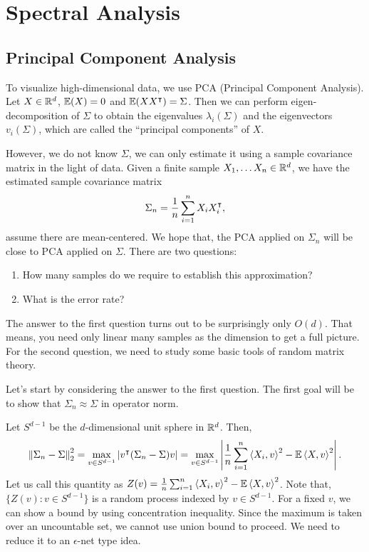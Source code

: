 \documentclass[12pt]{article}
\begin{document}
\section{Spectral Analysis}

\subsection{Principal Component Analysis}

To visualize high-dimensional data, we use PCA (Principal Component Analysis). Let $X \in \mathbb{R}^d$, $\mathbb{E}(X) = 0$ and $\mathbb{E}(XX^{\intercal}) = \Sigma$. Then we can perform eigen-decomposition of $\Sigma$ to obtain the eigenvalues $\lambda_i(\Sigma)$ and the eigenvectors $v_i(\Sigma)$, which are called the ``principal components'' of $X$. 

However, we do not know $\Sigma$, we can only estimate it using a sample covariance matrix in the light of data. Given a finite sample $X_1, \dots X_n \in \mathbb{R}^d$, we have the estimated sample covariance matrix 
\begin{equation*}
    \Sigma_n = \dfrac{1}{n}\sum_{i=1}^n X_i X_i^{\intercal},
\end{equation*}
\noindent assume there are mean-centered. We hope that, the PCA applied on $\Sigma_n$ will be close to PCA applied on $\Sigma$. There are two questions:

\begin{enumerate}
    \item How many samples do we require to establish this approximation?
    \item What is the error rate? 
\end{enumerate}

The answer to the first question turns out to be surprisingly only $O(d)$. That means, you need only linear many samples as the dimension to get a full picture. For the second question, we need to study some basic tools of random matrix theory.

Let's start by considering the answer to the first question. The first goal will be to show that $\Sigma_n \approx \Sigma$ in operator norm.

Let $S^{d-1}$ be the $d$-dimensional unit sphere in $\mathbb{R}^d$. Then,
\begin{equation*}
    \left\Vert \Sigma_n - \Sigma \right\Vert_2^2 = \max_{v \in S^{d-1}} \left\lvert v^{\intercal} (\Sigma_n - \Sigma)v \right\rvert = \max_{v \in S^{d-1}} \left\vert \dfrac{1}{n}\sum_{i=1}^n \left\langle X_i, v \right\rangle^2 - \mathbb{E}\left\langle X, v \right\rangle^2 \right\vert.
\end{equation*}
\noindent Let us call this quantity as $Z(v) = \frac{1}{n}\sum_{i=1}^n \left\langle X_i, v \right\rangle^2 - \mathbb{E}\left\langle X, v \right\rangle^2$. Note that, $\{ Z(v): v \in S^{d-1} \}$ is a random process indexed by $v \in S^{d-1}$. For a fixed $v$, we can show a bound by using concentration inequality. Since the maximum is taken over an uncountable set, we cannot use union bound to proceed. We need to reduce it to an $\epsilon$-net type idea.
\end{document}
